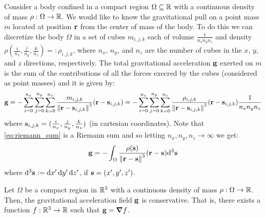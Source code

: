 \documentclass[../main.tex]{subfiles}
\begin{document}
Consider a body confined in a compact region $\Omega\subseteq\mathbb{R}$ with a continuous density of mass $\rho:\Omega\to\mathbb{R}$. We would like to know the gravitational pull on a point mass $m$ located at position $\boldsymbol{\mathrm{r}}$ from the center of mass of the body. To do this we can discretize the body $\Omega$ in a set of cubes $m_{i,j,k}$ each of volume $\frac{1}{n_xn_yn_z}$ and density $\rho(\frac{i}{n_x},\frac{j}{n_y},\frac{k}{n_z})=:\rho_{i,j,k}$, where $n_x$, $n_y$, and $n_z$ are the number of cubes in the $x$, $y$, and $z$ directions, respectively. The total gravitational acceleration $\boldsymbol{\mathrm{g}}$ exerted on $m$ is the sum of the contributions of all the forces execred by the cubes (considered as point masses) and it is given by:
\begin{equation}\label{eq:riemann_sum}
  \boldsymbol{\mathrm{g}}=-\sum_{i=0}^{n_x}\sum_{j=0}^{n_y}\sum_{k=0}^{n_z}\frac{m_{i,j,k}}{\left\|\boldsymbol{\mathrm{r}}-\boldsymbol{\mathrm{s}}_{i,j,k}\right\|^3}(\boldsymbol{\mathrm{r}}-\boldsymbol{\mathrm{s}}_{i,j,k})=-\sum_{i=0}^{n_x}\sum_{j=0}^{n_y}\sum_{k=0}^{n_z}\frac{\rho_{i,j,k}}{\left\|\boldsymbol{\mathrm{r}}-\boldsymbol{\mathrm{s}}_{i,j,k}\right\|^3}(\boldsymbol{\mathrm{r}}-\boldsymbol{\mathrm{s}}_{i,j,k})\frac{1}{n_xn_yn_z}
\end{equation}
where $\boldsymbol{\mathrm{s}}_{i,j,k}=(\frac{i}{n_x},\frac{j}{n_y},\frac{k}{n_z})$ (in cartesian coordinates). Note that \cref{eq:riemann_sum} is a Riemann sum and so letting $n_x,n_y,n_z\to\infty$ we get:
\begin{equation}\label{eq:limit}
  \boldsymbol{\mathrm{g}}=-\int_{\Omega}\frac{\rho(\boldsymbol{\mathrm{s}})}{\left\|\boldsymbol{\mathrm{r}}-\boldsymbol{\mathrm{s}}\right\|^3}(\boldsymbol{\mathrm{r}}-\boldsymbol{\mathrm{s}})\dd^3{\boldsymbol{\mathrm{s}}}
\end{equation}
where $\dd^3{\boldsymbol{\mathrm{s}}}:=\dd{x'}\dd{y'}\dd{z'}$, if $\boldsymbol{\mathrm{s}}=(x',y',z')$.
\begin{theorem}\label{thm:conservative}
  Let $\Omega$ be a compact region in $\mathbb{R}^3$ with a continuous density of mass $\rho:\Omega\to\mathbb{R}$. Then, the gravitational acceleration field $\boldsymbol{\mathrm{g}}$ is conservative. That is, there exists a function $f:\mathbb{R}^3\rightarrow\mathbb{R}$ such that $\boldsymbol{\mathrm{g}}=\grad f$.
\end{theorem}
\end{document}
